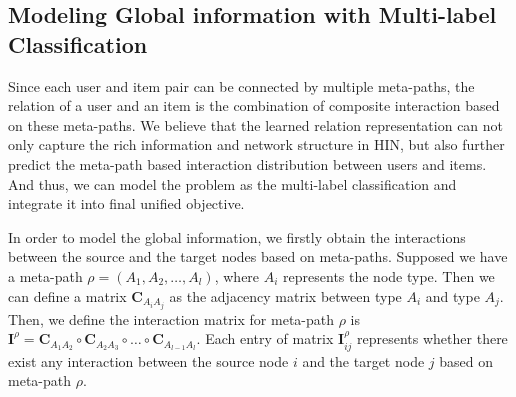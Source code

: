 \subsection{Modeling Global information with Multi-label Classification}
Since each user and item pair can be connected by multiple meta-paths, the relation of a user and an item is the combination of composite interaction based on these meta-paths.
We believe that the learned relation representation can not only capture the rich information and network structure in HIN, but also further predict the meta-path based interaction distribution between users and items. And thus, we can model the problem as the multi-label classification and integrate it into final unified objective.  



In order to model the global information, we firstly obtain the interactions between the source and the target nodes based on meta-paths. Supposed we have a meta-path $\rho = (A_1, A_2, \ldots, A_l)$, where $A_i$ represents the node type. Then we can define a matrix $\bm{C}_{{A_i}{A_j}}$ as the adjacency matrix between type $A_i$ and type $A_j$. Then, we define the interaction matrix for meta-path $\rho$ is $\bm{I}^{\rho} = \bm{C}_{{A_1}{A_2}} \circ \bm{C}_{{A_2}{A_3}} \circ \ldots \circ \bm{C}_{{A_{l-1}}{A_l}}$. %
Each entry of matrix $\bm{I}^{\rho}_{ij}$ represents whether there exist any interaction between the source node $i$  and the target node $j$ based on meta-path $\rho$.

